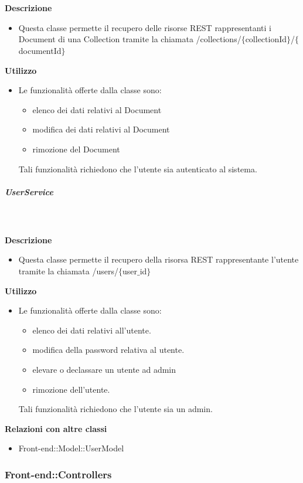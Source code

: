 				\textbf{\\ \\ Descrizione} 
					\begin{itemize}
						\item[] Questa classe permette il recupero delle risorse REST rappresentanti i Document di una Collection tramite la chiamata /collections/$\{$collectionId$\}$/$\{$documentId$\}$
					\end{itemize}      
				\textbf{Utilizzo}  
					\begin{itemize}
						\item[] Le funzionalità offerte dalla classe sono: 
\begin{itemize} 
\item elenco dei dati relativi al Document 
\item modifica dei dati relativi al Document
\item rimozione del Document 
\end{itemize} 
Tali funzionalità richiedono che l'utente sia autenticato al sistema.
					\end{itemize}
			\subparagraph{UserService}
				
				\textbf{\\ \\ Descrizione} 
					\begin{itemize}
						\item[] Questa classe permette il recupero della risorsa REST rappresentante l'utente tramite la chiamata /users/$\{$user$\_$id$\}$
					\end{itemize}      
				\textbf{Utilizzo}  
					\begin{itemize}
						\item[] Le funzionalità offerte dalla classe sono: 
\begin{itemize} 
\item elenco dei dati relativi all'utente. 
\item modifica della password relativa al utente.
\item elevare o declassare un utente ad admin 
\item rimozione dell'utente.
\end{itemize}
Tali funzionalità richiedono che l'utente sia un admin.
					\end{itemize}
					\textbf{Relazioni con altre classi}
					\begin{itemize}
							\item{Front-end::Model::UserModel}
					\end{itemize}
	\subsubsection{Front-end::Controllers}
